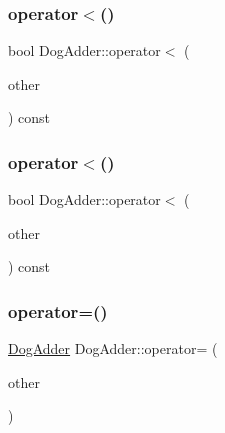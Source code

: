 \mbox{\label{class_dog_adder_a6d87d3ee06c0167e7552ba83daa629e7}} 
\subsubsection{\texorpdfstring{operator$<$()}{operator<()}\hspace{0.1cm}{\footnotesize\ttfamily [2/3]}}
{\footnotesize\ttfamily bool Dog\+Adder\+::operator$<$ (\begin{DoxyParamCaption}\item[{const \mbox{\hyperlink{class_dog_adder}{Dog\+Adder}} \&}]{other }\end{DoxyParamCaption}) const\hspace{0.3cm}{\ttfamily [inline]}}

\mbox{\label{class_dog_adder_a6d87d3ee06c0167e7552ba83daa629e7}} 
\subsubsection{\texorpdfstring{operator$<$()}{operator<()}\hspace{0.1cm}{\footnotesize\ttfamily [3/3]}}
{\footnotesize\ttfamily bool Dog\+Adder\+::operator$<$ (\begin{DoxyParamCaption}\item[{const \mbox{\hyperlink{class_dog_adder}{Dog\+Adder}} \&}]{other }\end{DoxyParamCaption}) const\hspace{0.3cm}{\ttfamily [inline]}}

\mbox{\label{class_dog_adder_a13bd773069c15b083f876b8afd512247}} 
\subsubsection{\texorpdfstring{operator=()}{operator=()}\hspace{0.1cm}{\footnotesize\ttfamily [1/3]}}
{\footnotesize\ttfamily \mbox{\hyperlink{class_dog_adder}{Dog\+Adder}} Dog\+Adder\+::operator= (\begin{DoxyParamCaption}\item[{const \mbox{\hyperlink{class_dog_adder}{Dog\+Adder}} \&}]{other }\end{DoxyParamCaption})\hspace{0.3cm}{\ttfamily [inline]}}

